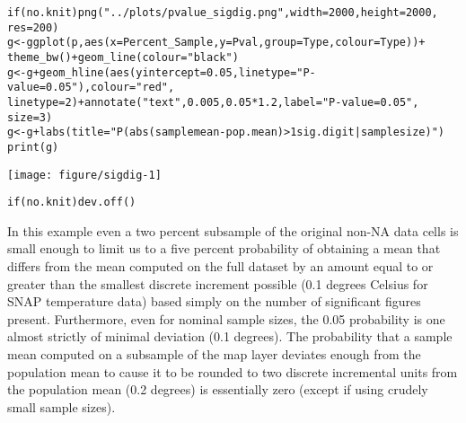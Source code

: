 \documentclass{article}\usepackage[]{graphicx}\usepackage[]{color}
\makeatletter
\def\maxwidth{ %
  \ifdim\Gin@nat@width>\linewidth
    \linewidth
  \else
    \Gin@nat@width
  \fi
}
\newcommand{\hlnum}[1]{\textcolor[rgb]{0.863,0.196,0.184}{#1}}%
\newcommand{\hlstr}[1]{\textcolor[rgb]{0.863,0.196,0.184}{#1}}%
\newcommand{\hlopt}[1]{\textcolor[rgb]{0.576,0.631,0.631}{#1}}%
\newcommand{\hlstd}[1]{\textcolor[rgb]{0.514,0.58,0.588}{#1}}%
\newcommand{\hlkwa}[1]{\textcolor[rgb]{0.796,0.294,0.086}{#1}}%
\newcommand{\hlkwb}[1]{\textcolor[rgb]{0.522,0.6,0}{#1}}%
\newcommand{\hlkwc}[1]{\textcolor[rgb]{0.796,0.294,0.086}{#1}}%
\newcommand{\hlkwd}[1]{\textcolor[rgb]{0.576,0.631,0.631}{#1}}%
\newenvironment{kframe}{%
 \def\at@end@of@kframe{}%
 \ifinner\ifhmode%
  \def\at@end@of@kframe{\end{minipage}}%
  \begin{minipage}{\columnwidth}%
 \fi\fi%
 \def\FrameCommand##1{\hskip\@totalleftmargin \hskip-\fboxsep
 \colorbox{shadecolor}{##1}\hskip-\fboxsep
     \hskip-\linewidth \hskip-\@totalleftmargin \hskip\columnwidth}%
 \MakeFramed {\advance\hsize-\width
   \@totalleftmargin\z@ \linewidth\hsize
   \@setminipage}}%
 {\par\unskip\endMakeFramed%
 \at@end@of@kframe}
\newenvironment{knitrout}{}{} %
\makeatother
\begin{document}
\begin{knitrout}
\color{fgcolor}\begin{kframe}
\begin{alltt}
\hlkwa{if} \hlstd{(no.knit)} \hlkwd{png}\hlstd{(}\hlstr{"../plots/pvalue_sigdig.png"}\hlstd{,} \hlkwc{width} \hlstd{=} \hlnum{2000}\hlstd{,} \hlkwc{height} \hlstd{=} \hlnum{2000}\hlstd{,}
    \hlkwc{res} \hlstd{=} \hlnum{200}\hlstd{)}
\hlstd{g} \hlkwb{<-} \hlkwd{ggplot}\hlstd{(p,} \hlkwd{aes}\hlstd{(}\hlkwc{x} \hlstd{= Percent_Sample,} \hlkwc{y} \hlstd{= Pval,} \hlkwc{group} \hlstd{= Type,} \hlkwc{colour} \hlstd{= Type))} \hlopt{+}
    \hlkwd{theme_bw}\hlstd{()} \hlopt{+} \hlkwd{geom_line}\hlstd{(}\hlkwc{colour} \hlstd{=} \hlstr{"black"}\hlstd{)}
\hlstd{g} \hlkwb{<-} \hlstd{g} \hlopt{+} \hlkwd{geom_hline}\hlstd{(}\hlkwd{aes}\hlstd{(}\hlkwc{yintercept} \hlstd{=} \hlnum{0.05}\hlstd{,} \hlkwc{linetype} \hlstd{=} \hlstr{"P-value = 0.05"}\hlstd{),} \hlkwc{colour} \hlstd{=} \hlstr{"red"}\hlstd{,}
    \hlkwc{linetype} \hlstd{=} \hlnum{2}\hlstd{)} \hlopt{+} \hlkwd{annotate}\hlstd{(}\hlstr{"text"}\hlstd{,} \hlnum{0.005}\hlstd{,} \hlnum{0.05} \hlopt{*} \hlnum{1.2}\hlstd{,} \hlkwc{label} \hlstd{=} \hlstr{"P-value = 0.05"}\hlstd{,}
    \hlkwc{size} \hlstd{=} \hlnum{3}\hlstd{)}
\hlstd{g} \hlkwb{<-} \hlstd{g} \hlopt{+} \hlkwd{labs}\hlstd{(}\hlkwc{title} \hlstd{=} \hlstr{"P(abs(sample mean - pop. mean) > 1 sig. digit | sample size)"}\hlstd{)}
\hlkwd{print}\hlstd{(g)}
\end{alltt}
\end{kframe}
\texttt{[image: figure/sigdig-1]} 
\begin{kframe}\begin{alltt}
\hlkwa{if} \hlstd{(no.knit)} \hlkwd{dev.off}\hlstd{()}
\end{alltt}
\end{kframe}
\end{knitrout}

In this example even a two percent subsample of the original non-NA data cells is small enough to limit us to a five percent probability of obtaining a mean that differs from the mean computed on the full dataset
by an amount equal to or greater than the smallest discrete increment possible (0.1 degrees Celsius for SNAP temperature data) based simply on the number of significant figures present.
Furthermore, even for nominal sample sizes, the 0.05 probability is one almost strictly of minimal deviation (0.1 degrees).
The probability that a sample mean computed on a subsample of the map layer deviates enough from the population mean
to cause it to be rounded to two discrete incremental units from the population mean (0.2 degrees) is essentially zero (except if using crudely small sample sizes).
\end{document}

